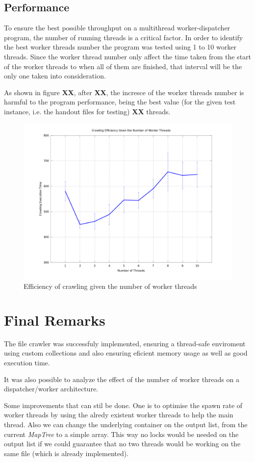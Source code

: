 \documentclass[twocolumn,20pt]{article}
\begin{document}
\subsection{Performance}
To ensure the best possible throughput on a multithread worker-dispatcher program, the number of running threads is a critical factor. In order to identify the best worker threads number the program was tested using 1 to 10 worker threads. Since the worker thread number only affect the time taken from the start of the worker threads to when all of them are finished, that interval will be the only one taken into consideration.

As shown in figure \textbf{XX}, after \textbf{XX}, the incresce of the worker threads number is harmful to the program performance, being the best value (for the given test instance, i.e. the handout files for testing) \textbf{XX} threads.

\begin{figure}[h]
\centering
\includegraphics[scale=0.20]{effPerThreadError.png}
\caption{Efficiency of crawling given the number of worker threads}
\label{fig:eff}
\end{figure}

\section{Final Remarks}
The file crawler was successfuly implemented, ensuring a thread-safe enviroment using custom collections and also ensuring eficient memory usage as well as good execution time.

It was also possible to analyze the effect of the number of worker threads on a dispatcher/worker architecture.

Some improvements that can stil be done. One is to optimise the spawn rate of worker threads by using the alredy existent worker threads to help the main thread. Also we can change the underlying container on the output list, from the current \textit{MapTree} to a simple array. This way no locks would be needed on the output list if we could guarantee that no two threads would be working on the same file (which is already implemented).
\end{document}
